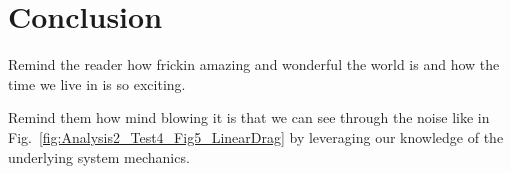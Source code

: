 \section{Conclusion}

Remind the reader how frickin amazing and wonderful the world is and how the time we live in is so exciting.

Remind them how mind blowing it is that we can see through the noise like in Fig.~\ref{fig:Analysis2_Test4_Fig5_LinearDrag} by leveraging our knowledge of the underlying system mechanics. 

\TODO